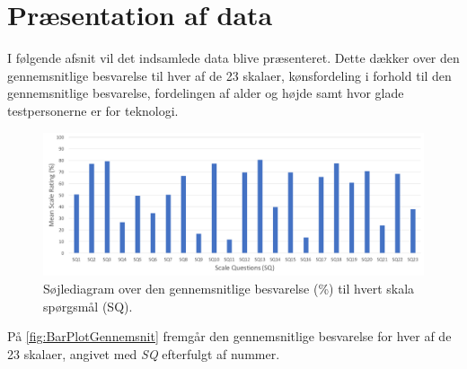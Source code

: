 \section{Præsentation af data}
\label{TestAfSkalaPraesentationAfData}
%
I følgende afsnit vil det indsamlede data blive præsenteret. Dette dækker over den gennemsnitlige besvarelse til hver af de 23 skalaer, kønsfordeling i forhold til den gennemsnitlige besvarelse, fordelingen af alder og højde samt hvor glade testpersonerne er for teknologi. 
%
\begin{figure}[H]
\centering
\includegraphics[width = \textwidth]{Figure/DatabehandlingSkalaer/DataPresentation/MeanBarplot} 
\caption{Søjlediagram over den gennemsnitlige besvarelse (\%) til hvert skala spørgsmål (SQ).}
\label{fig:BarPlotGennemsnit}
\end{figure}
\noindent
%
På \autoref{fig:BarPlotGennemsnit} fremgår den gennemsnitlige besvarelse for hver af de 23 skalaer, angivet med \textit{SQ} efterfulgt af nummer.
%
